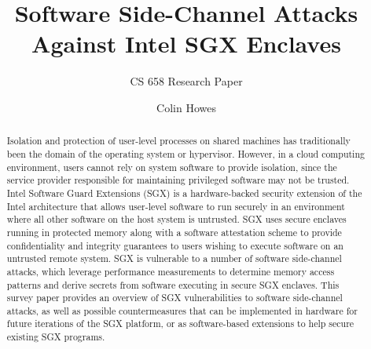 \documentclass[sigconf]{acmart}
\begin{document}
\title{Software Side-Channel Attacks Against Intel SGX Enclaves}
\subtitle{CS 658 Research Paper}


\author{Colin Howes}

\begin{abstract}

Isolation and protection of user-level processes on shared machines has traditionally been the domain of the operating system or hypervisor. However, in a cloud computing environment, users cannot rely on system software to provide isolation, since the service provider responsible for maintaining privileged software may not be trusted. Intel Software Guard Extensions (SGX) is a hardware-backed security extension of the Intel architecture that allows user-level software to run securely in an environment where all other software on the host system is untrusted. SGX uses secure enclaves running in protected memory along with a software attestation scheme to provide confidentiality and integrity guarantees to users wishing to execute software on an untrusted remote system. SGX is vulnerable to a number of software side-channel attacks, which leverage performance measurements to determine memory access patterns and derive secrets from software executing in secure SGX enclaves. This survey paper provides an overview of SGX vulnerabilities to software side-channel attacks, as well as possible countermeasures that can be implemented in hardware for future iterations of the SGX platform, or as software-based extensions to help secure existing SGX programs.

\end{abstract}

\maketitle




 
\end{document}
